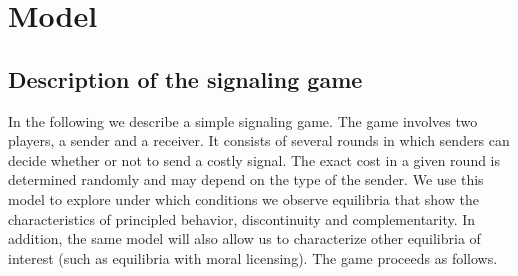 \documentclass[11pt]{article}
\theoremstyle{plainCl1}
\begin{document}
\section{Model}

\subsection{Description of the signaling game}


In the following we describe a simple signaling game. The game involves two players, a sender and a receiver. It consists of several rounds in which senders can decide whether or not to send a costly signal. The exact cost in a given round is determined randomly and may depend on the type of the sender. We use this model to explore under which conditions we observe equilibria that show the characteristics of principled behavior, discontinuity and complementarity. In addition, the same model will also allow us to characterize other equilibria of interest (such as equilibria with moral licensing).
The game proceeds as follows. 
\end{document}
